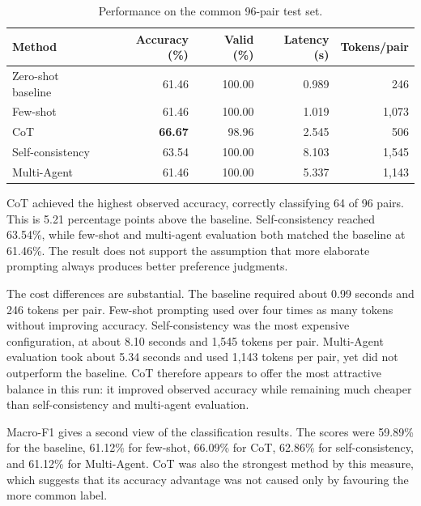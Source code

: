 \documentclass[10pt]{article}
\begin{document}
\begin{table}[ht]
\centering
\small
\begin{tabular}{@{}lrrrr@{}}
\toprule
Method & Accuracy (\%) & Valid (\%) & Latency (s) & Tokens/pair \\
\midrule
Zero-shot baseline & 61.46 & 100.00 & 0.989 & 246 \\
Few-shot & 61.46 & 100.00 & 1.019 & 1,073 \\
CoT & \textbf{66.67} & 98.96 & 2.545 & 506 \\
Self-consistency & 63.54 & 100.00 & 8.103 & 1,545 \\
Multi-Agent & 61.46 & 100.00 & 5.337 & 1,143 \\
\bottomrule
\end{tabular}
\caption{Performance on the common 96-pair test set.}
\label{tab:main-results}
\end{table}

CoT achieved the highest observed accuracy, correctly classifying 64 of 96 pairs. This is 5.21 percentage points above the baseline. Self-consistency reached 63.54\%, while few-shot and multi-agent evaluation both matched the baseline at 61.46\%. The result does not support the assumption that more elaborate prompting always produces better preference judgments.

The cost differences are substantial. The baseline required about 0.99 seconds and 246 tokens per pair. Few-shot prompting used over four times as many tokens without improving accuracy. Self-consistency was the most expensive configuration, at about 8.10 seconds and 1,545 tokens per pair. Multi-Agent evaluation took about 5.34 seconds and used 1,143 tokens per pair, yet did not outperform the baseline. CoT therefore appears to offer the most attractive balance in this run: it improved observed accuracy while remaining much cheaper than self-consistency and multi-agent evaluation.

Macro-F1 gives a second view of the classification results. The scores were 59.89\% for the baseline, 61.12\% for few-shot, 66.09\% for CoT, 62.86\% for self-consistency, and 61.12\% for Multi-Agent. CoT was also the strongest method by this measure, which suggests that its accuracy advantage was not caused only by favouring the more common label.
\end{document}
